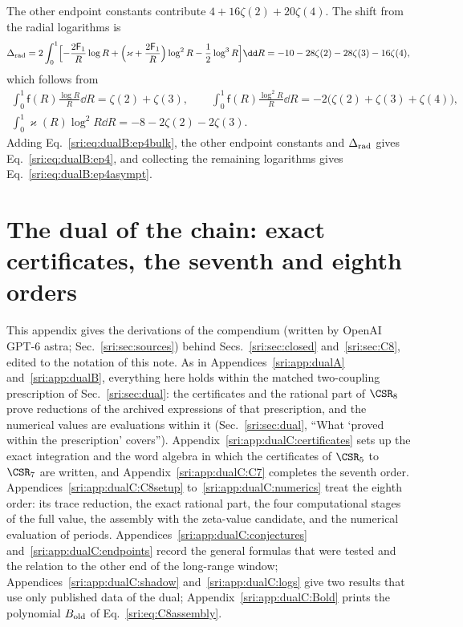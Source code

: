 The other endpoint constants contribute $4+16\zeta(2)+20\zeta(4)$. The shift from the radial logarithms is
\begin{equation}
 \Delta_{\rm rad}=2\int_0^1\Bigl[-\frac{2\mathsf F_1}{R}\log R+\Bigl(\varkappa+\frac{2\mathsf F_1}{R}\Bigr)\log^2R
 -\frac12\log^3R\Bigr]\dd R=-10-28\zeta(2)-28\zeta(3)-16\zeta(4),
\end{equation}
which follows from
\begin{equation}
\begin{gathered}
 \int_0^1\mathsf f(R)\frac{\log R}{R}\dd R=\zeta(2)+\zeta(3),\qquad
 \int_0^1\mathsf f(R)\frac{\log^2R}{R}\dd R=-2\bigl(\zeta(2)+\zeta(3)+\zeta(4)\bigr),\\
 \int_0^1\varkappa(R)\log^2R\dd R=-8-2\zeta(2)-2\zeta(3).
\end{gathered}
\end{equation}
Adding Eq.~\eqref{sri:eq:dualB:ep4bulk}, the other endpoint constants and $\Delta_{\rm rad}$ gives
Eq.~\eqref{sri:eq:dualB:ep4}, and collecting the remaining logarithms gives Eq.~\eqref{sri:eq:dualB:ep4asympt}.

\section{The dual of the chain: exact certificates, the seventh and eighth orders}\label{sri:app:dualC}
This appendix gives the derivations of the compendium (written by OpenAI GPT-6 astra; Sec.~\ref{sri:sec:sources}) behind
Secs.~\ref{sri:sec:closed} and~\ref{sri:sec:C8}, edited to the notation of this note. As in Appendices~\ref{sri:app:dualA}
and~\ref{sri:app:dualB}, everything here holds within the matched two-coupling prescription of Sec.~\ref{sri:sec:dual}: the
certificates and the rational part of $\CSR_8$ prove reductions of the archived expressions of that prescription, and
the numerical values are evaluations within it (Sec.~\ref{sri:sec:dual}, ``What `proved within the prescription'
covers''). Appendix~\ref{sri:app:dualC:certificates}
sets up the exact integration and the word algebra in which the certificates of $\CSR_5$ to $\CSR_7$ are written, and
Appendix~\ref{sri:app:dualC:C7} completes the seventh order. Appendices~\ref{sri:app:dualC:C8setup} to~\ref{sri:app:dualC:numerics}
treat the eighth order: its trace reduction, the exact rational part, the four computational stages of the full
value, the assembly with the zeta-value candidate, and the numerical evaluation of periods.
Appendices~\ref{sri:app:dualC:conjectures} and~\ref{sri:app:dualC:endpoints} record the general formulas that were tested and
the relation to the other end of the long-range window; Appendices~\ref{sri:app:dualC:shadow} and~\ref{sri:app:dualC:logs} give two
results that use only published data of the dual; Appendix~\ref{sri:app:dualC:Bold} prints the polynomial $B_{\rm old}$ of
Eq.~\eqref{sri:eq:C8assembly}.

